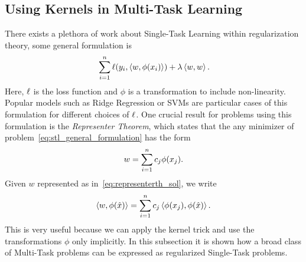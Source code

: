 \subsection{Using Kernels in Multi-Task Learning} \label{subsec:kernels_mtl}
There exists a plethora of work about Single-Task Learning within regularization theory, some general formulation is
\begin{equation}
    \label{eq:stl_general_formulation}
    \begin{aligned}
        & \sum_{i=1}^{\nsamples} \lossf(y_i, \dotp{w}{\phi(x_i)}) + \lambda \dotp{w}{w} .\\
    \end{aligned}
\end{equation}
Here, $\ell$ is the loss function and $\phi$ is a transformation to include non-linearity. Popular models such as Ridge Regression or SVMs are particular cases of this formulation for different choices of $\ell$.
One crucial result for problems using this formulation is the \emph{Representer Theorem}, which states that the any minimizer of problem~\eqref{eq:stl_general_formulation} has the form
\begin{equation}
    \label{eq:representerth_sol}
    w = \sum_{i=1}^\nsamples c_j \phi(x_j) .
\end{equation}
Given $w$ represented as in~\eqref{eq:representerth_sol}, we write
\begin{equation}
    \nonumber
    \left\langle w, \phi(\hat{x}) \right\rangle = \sum_{i=1}^n c_j \left\langle \phi(x_j), \phi(\hat{x}) \right\rangle.
\end{equation}
This is very useful because we can apply the kernel trick and use the transformations $\phi$ only implicitly.
In this subsection it is shown how a broad class of Multi-Task problems can be expressed as regularized Single-Task problems.

